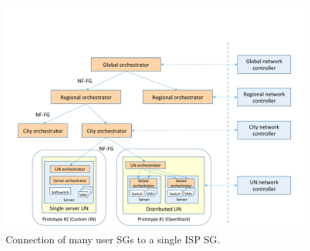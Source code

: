 \begin{figure} %
	\centering
	\includegraphics[clip= true, width= 0.9\columnwidth, trim= 0.1cm 1.2cm 0cm 0.0cm, page= 19]{images/Pictures_definitivo.pdf}
	\caption{Connection of many user SGs to a single ISP SG.}
	\label{fig:endpoints}
\end{figure}

